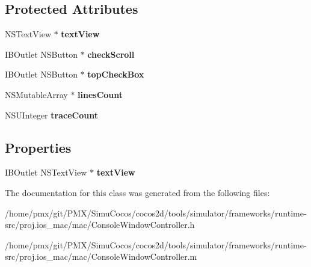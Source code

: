 \subsection*{Protected Attributes}
\begin{DoxyCompactItemize}
\item 
\mbox{\label{interfaceConsoleWindowController_add677af4afc543748f92573a95113ff0}} 
N\+S\+Text\+View $\ast$ {\bfseries text\+View}
\item 
\mbox{\label{interfaceConsoleWindowController_a6296f19e6420434758a21b6af5148584}} 
I\+B\+Outlet N\+S\+Button $\ast$ {\bfseries check\+Scroll}
\item 
\mbox{\label{interfaceConsoleWindowController_a41faca42d590df0fae992a2cf7e9bd6d}} 
I\+B\+Outlet N\+S\+Button $\ast$ {\bfseries top\+Check\+Box}
\item 
\mbox{\label{interfaceConsoleWindowController_a003b35375d78ffa297aedd18bfde3f13}} 
N\+S\+Mutable\+Array $\ast$ {\bfseries lines\+Count}
\item 
\mbox{\label{interfaceConsoleWindowController_aff81eac3dac188773e11b2dfb6ed3263}} 
N\+S\+U\+Integer {\bfseries trace\+Count}
\end{DoxyCompactItemize}
\subsection*{Properties}
\begin{DoxyCompactItemize}
\item 
\mbox{\label{interfaceConsoleWindowController_ac6f80292b2d1081d2233a237907690fa}} 
I\+B\+Outlet N\+S\+Text\+View $\ast$ {\bfseries text\+View}
\end{DoxyCompactItemize}


The documentation for this class was generated from the following files\+:\begin{DoxyCompactItemize}
\item 
/home/pmx/git/\+P\+M\+X/\+Simu\+Cocos/cocos2d/tools/simulator/frameworks/runtime-\/src/proj.\+ios\+\_\+mac/mac/Console\+Window\+Controller.\+h\item 
/home/pmx/git/\+P\+M\+X/\+Simu\+Cocos/cocos2d/tools/simulator/frameworks/runtime-\/src/proj.\+ios\+\_\+mac/mac/Console\+Window\+Controller.\+m\end{DoxyCompactItemize}
